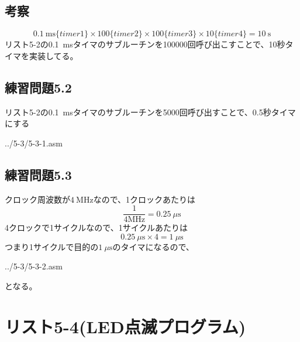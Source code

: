 \documentclass[a4paper,12pt]{ujarticle}
\begin{document}
  \subsection{考察}
  \[
    \SI{0.1}{\milli\second}\{timer1\} \times 100\{timer2\} \times 100\{timer3\} \times 10\{timer4\} = \SI{10}{\second}
  \]
  リスト5-2の\SI{0.1}{\milli\second}タイマのサブルーチンを100000回呼び出こすことで、10秒タイマを実装してる。
  \subsection{練習問題5.2}
  リスト5-2の\SI{0.1}{\milli\second}タイマのサブルーチンを5000回呼び出すことで、0.5秒タイマにする
   \begin{lstinputlisting}[basicstyle=\ttfamily\footnotesize, frame=single]
   {../5-3/5-3-1.asm}
   \end{lstinputlisting}
   \subsection{練習問題5.3}
   クロック周波数が$\SI{4}{\mega\hertz}$なので、1クロックあたりは
   \[
     \frac{1}{4\si{\mega\hertz}} = \SI{0.25}{\mu\second}
   \]
   4クロックで1サイクルなので、1サイクルあたりは
   \[
     \SI{0.25}{\mu\second} \times 4 = \SI{1}{\mu\second}
   \]
   つまり1サイクルで目的の$\SI{1}{\mu\second}$のタイマになるので、
   \begin{lstinputlisting}[basicstyle=\ttfamily\footnotesize, frame=single]
    {../5-3/5-3-2.asm}
   \end{lstinputlisting}
   となる。
   \clearpage
 \section{リスト5-4(LED点滅プログラム)}
\end{document}
